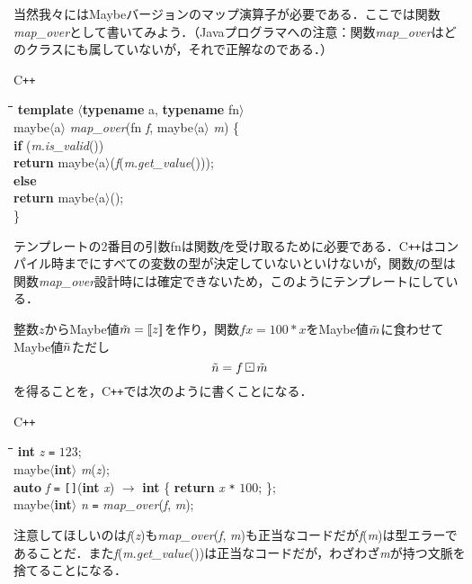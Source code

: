 \documentclass[twocolumn]{jsbook}
\def\[{[\![}
\def\]{]\!]}
\newcommand{\cxx}{\textrm{C}\texttt{++}}
\newenvironment{cxxcode}{\begin{itembox}[r]{\cxx}}{\end{itembox}}
\newenvironment{python}{\begin{tabbing}\hspace*{1em}\=\hspace*{1em}\=\hspace*{1em}\=\hspace*{1em}\=\kill}{\end{tabbing}}
\newcommand{\pthnClassname}[1]{\textrm{#1}}
\newcommand{\pthnId}[1]{\textit{#1}}
\newcommand{\pthnKeyword}[1]{\textbf{#1}}
\newcommand{\pthnOp}[1]{\texttt{#1}}
\DeclareMathOperator{\hsklMaybeMap}{\boxdot}
\newcommand{\hsklJust}[1]{\[#1\]}
\newcommand{\hsklMaybe}[1]{\Tilde{#1}}
\begin{document}
当然我々にはMaybeバージョンのマップ演算子が必要である．ここでは関数\pthnId{map\_over}として書いてみよう．（Javaプログラマへの注意：関数\pthnId{map\_over}はどのクラスにも属していないが，それで正解なのである．）
\begin{cxxcode}
\begin{python}
\pthnKeyword{template} $\langle$\pthnKeyword{typename} \pthnClassname{a}, \pthnKeyword{typename} \pthnClassname{fn}$\rangle$\\
\pthnClassname{maybe}$\langle$\pthnClassname{a}$\rangle$ \pthnId{map\_over}(\pthnClassname{fn} \pthnId{f}, \pthnClassname{maybe}$\langle$\pthnClassname{a}$\rangle$ \pthnId{m}) \{\\
\>\pthnKeyword{if} (\pthnId{m}.\pthnId{is\_valid}())\\
\>\>\pthnKeyword{return} \pthnClassname{maybe}$\langle$\pthnClassname{a}$\rangle$(\pthnId{f}(\pthnId{m}.\pthnId{get\_value}()));\\
\>\pthnKeyword{else}\\
\>\>\pthnKeyword{return} \pthnClassname{maybe}$\langle$\pthnClassname{a}$\rangle$();\\
\}
\end{python}
\end{cxxcode}
テンプレートの2番目の引数\pthnClassname{fn}は関数\pthnId{f}を受け取るために必要である．\cxx はコンパイル時までにすべての変数の型が決定していないといけないが，関数\pthnId{f}の型は関数\pthnId{map\_over}設計時には確定できないため，このようにテンプレートにしている．

整数$z$からMaybe値$\hsklMaybe{m}=\hsklJust{z}$を作り，関数$fx=100*x$をMaybe値$\hsklMaybe{m}$に食わせてMaybe値$\hsklMaybe{n}$ただし$$\hsklMaybe{n}=f\hsklMaybeMap\hsklMaybe{m}$$を得ることを，\cxx では次のように書くことになる．
\begin{cxxcode}
\begin{python}
\pthnKeyword{int} \pthnId{z} \pthnOp{=} $123$;\\
\pthnClassname{maybe}$\langle$\pthnKeyword{int}$\rangle$ \pthnId{m}(\pthnId{z});\\
\pthnKeyword{auto} \pthnId{f} \pthnOp{=} \pthnOp{[]}(\pthnKeyword{int} \pthnId{x}) $\rightarrow$ \pthnKeyword{int} \{ \pthnKeyword{return} \pthnId{x} \pthnOp{*} $100$; \};\\
\pthnClassname{maybe}$\langle$\pthnKeyword{int}$\rangle$ \pthnId{n} \pthnOp{=} \pthnId{map\_over}(\pthnId{f}, \pthnId{m});
\end{python}
\end{cxxcode}
注意してほしいのは\pthnId{f}(\pthnId{z})も\pthnId{map\_over}(\pthnId{f}, \pthnId{m})も正当なコードだが\pthnId{f}(\pthnId{m})は型エラーであることだ．また\pthnId{f}(\pthnId{m}.\pthnId{get\_value}())は正当なコードだが，わざわざ\pthnId{m}が持つ文脈を捨てることになる．
\end{document}
